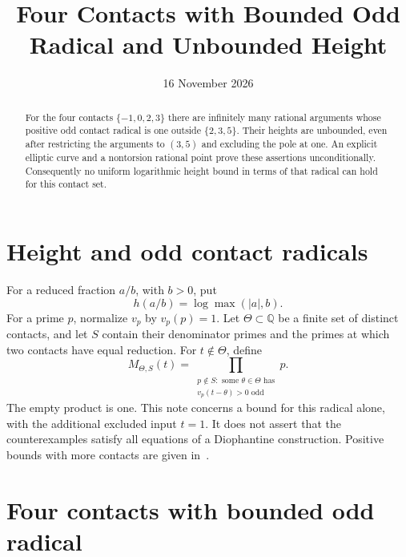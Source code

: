 \documentclass[11pt,a4paper]{article}
\title{Four Contacts with Bounded Odd Radical and Unbounded Height}
\author{}\date{16 November 2026}
\theoremstyle{definition}\newtheorem{definition}[theorem]{Definition}
\theoremstyle{remark}\newtheorem{remark}[theorem]{Remark}
\newcommand{\Q}{\mathbb Q}\newcommand{\Z}{\mathbb Z}
\begin{document}
\maketitle
\begin{abstract}
For the four contacts $\{-1,0,2,3\}$ there are infinitely many
rational arguments whose positive odd contact radical is one outside
$\{2,3,5\}$. Their heights are unbounded, even after restricting
the arguments to $(3,5)$ and excluding the pole at one. An explicit
elliptic curve and a nontorsion rational point prove these assertions
unconditionally. Consequently no uniform logarithmic height bound in
terms of that radical can hold for this contact set.
\end{abstract}

\section{Height and odd contact radicals}
For a reduced fraction $a/b$, with $b>0$, put
\[
                       h(a/b)=\log\max(|a|,b).
\]
For a prime $p$, normalize $v_p$ by $v_p(p)=1$.
Let $\Theta\subset\Q$ be a finite set of distinct contacts, and
let $S$ contain their denominator primes and the primes at which
two contacts have equal reduction. For $t\notin\Theta$, define
\begin{equation}\label{eq:radical}
 M_{\Theta,S}(t)=
 \prod_{\substack{p\notin S:\text{ some }\theta\in\Theta\text{ has}\\
                 v_p(t-\theta)>0\text{ odd}}}p.
\end{equation}
The empty product is one. This note concerns a bound for this radical
alone, with the additional excluded input $t=1$. It does not assert
that the counterexamples satisfy all equations of a Diophantine
construction. Positive bounds with more contacts are given
in~\cite{HeightBounds}.

\section{Four contacts with bounded odd radical}
\end{document}
